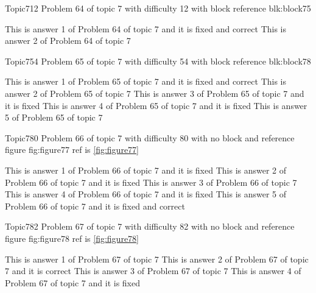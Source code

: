 \documentclass[master]{exam}
\begin{document}
\begin{problem}[requires=blk:block75]{Topic7}{12}
	Problem 64 of topic 7 with difficulty 12 with block reference blk:block75
	\begin{answers}
		 This is answer 1 of Problem 64 of topic 7 and it is fixed and correct
		\answer This is answer 2 of Problem 64 of topic 7 
	\end{answers}
\end{problem}

\begin{problem}[requires=blk:block78]{Topic7}{54}
	Problem 65 of topic 7 with difficulty 54 with block reference blk:block78
	\begin{answers}
		 This is answer 1 of Problem 65 of topic 7 and it is fixed and correct
		\answer This is answer 2 of Problem 65 of topic 7 
		\answer[fixed] This is answer 3 of Problem 65 of topic 7 and it is fixed
		\answer[fixed] This is answer 4 of Problem 65 of topic 7 and it is fixed
		\answer This is answer 5 of Problem 65 of topic 7 
	\end{answers}
\end{problem}

\begin{problem}{Topic7}{80}
	Problem 66 of topic 7 with difficulty 80 with no block and reference figure fig:figure77 ref is \ref{fig:figure77}
	\begin{answers}
		\answer[fixed] This is answer 1 of Problem 66 of topic 7 and it is fixed
		\answer[fixed] This is answer 2 of Problem 66 of topic 7 and it is fixed
		\answer This is answer 3 of Problem 66 of topic 7 
		\answer[fixed] This is answer 4 of Problem 66 of topic 7 and it is fixed
		 This is answer 5 of Problem 66 of topic 7 and it is fixed and correct
	\end{answers}
\end{problem}

\begin{problem}{Topic7}{82}
	Problem 67 of topic 7 with difficulty 82 with no block and reference figure fig:figure78 ref is \ref{fig:figure78}
	\begin{answers}
		\answer This is answer 1 of Problem 67 of topic 7 
		\answer[correct] This is answer 2 of Problem 67 of topic 7 and it is correct
		\answer This is answer 3 of Problem 67 of topic 7 
		\answer[fixed] This is answer 4 of Problem 67 of topic 7 and it is fixed
	\end{answers}
\end{problem}
\end{document}
